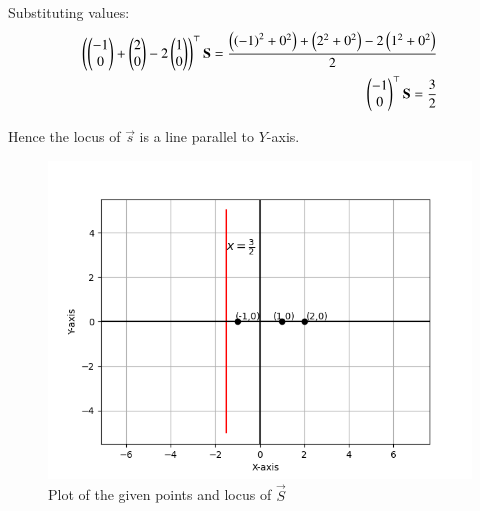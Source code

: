 \documentclass[journal]{IEEEtran}
\begin{document}
Substituting values:
\begin{align}
    \begin{pmatrix}\begin{pmatrix}-1\\0\end{pmatrix}+\begin{pmatrix}2\\0\end{pmatrix}-2\begin{pmatrix}1\\0\end{pmatrix}\end{pmatrix}^\top\mathbf{S}=\frac{\left(\left(-1\right)^2+0^2\right)+\left(2^2+0^2\right)-2\left(1^2+0^2\right)}{2}\\
    \begin{pmatrix}-1\\0\end{pmatrix}^\top\mathbf{S}=\frac{3}{2}
\end{align}

Hence the locus of $\vec{s}$ is a line parallel to $Y$-axis.

\begin{figure}[h!]
   \centering
   \includegraphics[width=0.7\linewidth]{figs/plot.png}
   \caption{Plot of the given points and locus of $\vec{S}$}
   \label{}
\end{figure}
\end{document}
